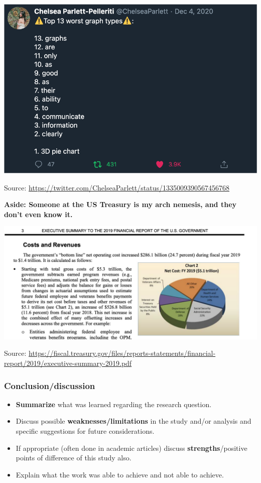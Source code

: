 \documentclass[
  openany]{book}
\providecommand{\tightlist}{%
  \setlength{\itemsep}{0pt}\setlength{\parskip}{0pt}}
\begin{document}
\begin{center}\includegraphics[width=1\linewidth]{images/m2/worst-graph} \end{center}

Source: \url{https://twitter.com/ChelseaParlett/status/1335009390567456768}

\textbf{Aside: Someone at the US Treasury is my arch nemesis, and they don't even know it.}

\begin{center}\includegraphics[width=0.9\linewidth]{images/m2/fiscal} \end{center}

Source: \url{https://fiscal.treasury.gov/files/reports-statements/financial-report/2019/executive-summary-2019.pdf}

\hypertarget{concreport}{%
\subsubsection{Conclusion/discussion}\label{concreport}}

\begin{itemize}
\tightlist
\item
  \textbf{Summarize} what was learned regarding the research question.
\item
  Discuss possible \textbf{weaknesses/limitations} in the study and/or analysis and specific suggestions for future considerations.
\item
  If appropriate (often done in academic articles) discuss \textbf{strengths}/positive points of difference of this study also.
\item
  Explain what the work was able to achieve and not able to achieve.
\end{itemize}
\end{document}
